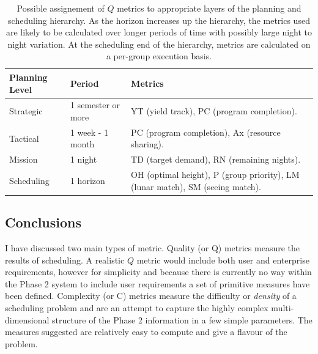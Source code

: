 \begin{table}[htbp]
 \begin{center}
  \begin{tabular} {|l|l|p{7cm}|}
    \hline
    Planning Level &  Period              &      Metrics\\
    \hline
    Strategic      &  1 semester or more  & YT (yield track), PC (program completion).\\
    \hline
    Tactical       &  1 week - 1 month    & PC (program completion), Ax (resource sharing).\\
    \hline
    Mission        &  1 night             & TD (target demand), RN (remaining nights).\\
    \hline
    Scheduling     &  1 horizon           & OH (optimal height), P (group priority), LM (lunar match), SM (seeing match).\\
    \hline
  \end{tabular}
  \label{tab:planning_metrics}
  \caption[Assignment of $Q$ metrics to hierarchic planning levels.]{Possible assignement of $Q$ metrics to appropriate layers of the planning and scheduling hierarchy. As the horizon increases up the hierarchy, the metrics used are likely to be calculated over longer periods of time with possibly large night to night variation. At the scheduling end of the hierarchy, metrics are calculated on a per-group execution basis.}
 \end{center}
\end{table}

\subsection{Conclusions}
I have discussed two main types of metric. Quality (or Q) metrics measure the results of scheduling. A realistic $Q$ metric would include both user and enterprise requirements, however for simplicity and because there is currently no way within the Phase 2 system to include user requirements a set of primitive measures have been defined. Complexity (or C) metrics measure the difficulty or \emph{density} of a scheduling problem and are an attempt to capture the highly complex multi-dimensional structure of the Phase 2 information in a few simple parameters. The measures suggested are relatively easy to compute and give a flavour of the problem.



